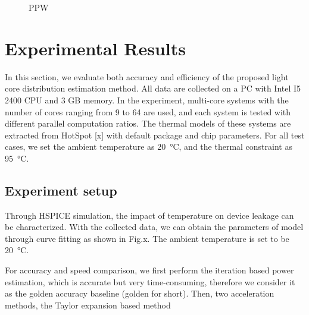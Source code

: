\begin{figure}[htb]
\centering
{}%
%
\caption{PPW}  
\label{fig:ppw}
\end{figure}


\section{Experimental Results}

In this section, we evaluate both accuracy and efficiency of the proposed light core distribution estimation method. All data are collected on a PC with Intel I5 2400 CPU and 3 GB memory. In the experiment, multi-core systems with the number of cores ranging from 9 to 64 are used, and each system is tested with different parallel computation ratios. The thermal models of these systems are extracted from HotSpot [x] with default package and chip parameters. For all test cases, we set the ambient temperature as \SI{20}{\degreeCelsius}, and the thermal constraint as \SI{95}{\degreeCelsius}. 

\subsection{Experiment setup}


Through HSPICE simulation, the impact of temperature on device leakage can be characterized. With the collected data, we can obtain the parameters of model through curve fitting as shown in Fig.x. The ambient temperature is set to be \SI{20}{\degreeCelsius}.

For accuracy and speed comparison, we first perform the iteration based power estimation, which is accurate but very time-consuming, therefore we consider it as the golden accuracy baseline (golden for short). Then, two acceleration methods, the Taylor expansion based method 